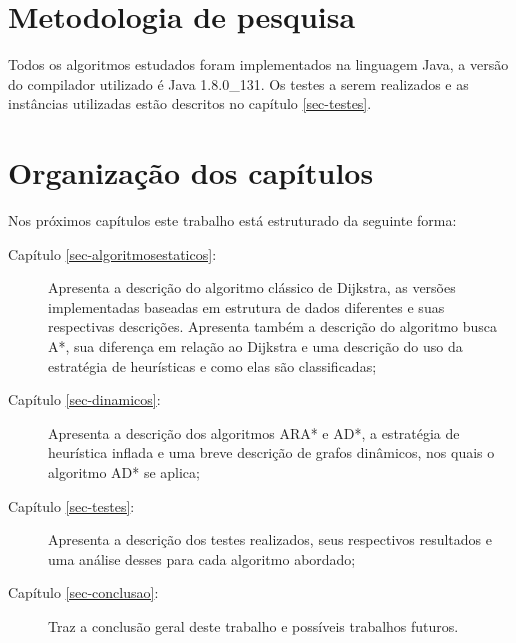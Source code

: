 \section{Metodologia de pesquisa}
\label{sec-intro-metodologia}
Todos os algoritmos estudados foram implementados na linguagem Java, a versão do compilador utilizado é Java 1.8.0\_131. Os testes a serem realizados e as instâncias utilizadas estão descritos no capítulo \ref{sec-testes}.
\newpage
\section{Organização dos capítulos}
\label{sec-intro-organizaocao}
Nos próximos capítulos este trabalho está estruturado da seguinte forma:
\begin{description}
\item[Capítulo \ref{sec-algoritmosestaticos}:] Apresenta a descrição do algoritmo clássico de Dijkstra, as versões implementadas baseadas em estrutura de dados diferentes e suas respectivas descrições. Apresenta também a descrição do algoritmo busca A*, sua diferença em relação ao Dijkstra e uma descrição do uso da estratégia de heurísticas e como elas são classificadas;
\item[Capítulo \ref{sec-dinamicos}:] Apresenta a descrição dos algoritmos ARA* e AD*, a estratégia de heurística inflada e uma breve descrição de grafos dinâmicos, nos quais o algoritmo AD* se aplica;
\item[Capítulo \ref{sec-testes}:] Apresenta a descrição dos testes realizados, seus respectivos resultados e uma análise desses para cada algoritmo abordado;
\item[Capítulo \ref{sec-conclusao}:] Traz a conclusão geral deste trabalho e possíveis trabalhos futuros.
\end{description}